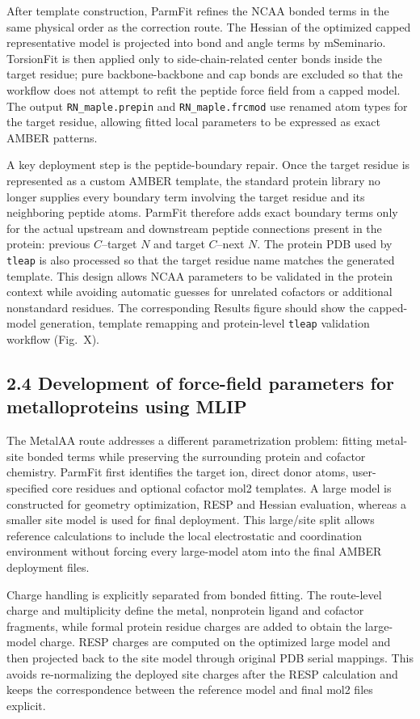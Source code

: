 After template construction, ParmFit refines the NCAA bonded terms in the same physical order as the correction route. The Hessian of the optimized capped representative model is projected into bond and angle terms by mSeminario. TorsionFit is then applied only to side-chain-related center bonds inside the target residue; pure backbone-backbone and cap bonds are excluded so that the workflow does not attempt to refit the peptide force field from a capped model. The output \texttt{RN\_maple.prepin} and \texttt{RN\_maple.frcmod} use renamed atom types for the target residue, allowing fitted local parameters to be expressed as exact AMBER patterns.

A key deployment step is the peptide-boundary repair. Once the target residue is represented as a custom AMBER template, the standard protein library no longer supplies every boundary term involving the target residue and its neighboring peptide atoms. ParmFit therefore adds exact boundary terms only for the actual upstream and downstream peptide connections present in the protein: previous $C$--target $N$ and target $C$--next $N$. The protein PDB used by \texttt{tleap} is also processed so that the target residue name matches the generated template. This design allows NCAA parameters to be validated in the protein context while avoiding automatic guesses for unrelated cofactors or additional nonstandard residues. The corresponding Results figure should show the capped-model generation, template remapping and protein-level \texttt{tleap} validation workflow (Fig.~X).

\subsection{2.4 Development of force-field parameters for metalloproteins using MLIP}

The MetalAA route addresses a different parametrization problem: fitting metal-site bonded terms while preserving the surrounding protein and cofactor chemistry. ParmFit first identifies the target ion, direct donor atoms, user-specified core residues and optional cofactor mol2 templates. A large model is constructed for geometry optimization, RESP and Hessian evaluation, whereas a smaller site model is used for final deployment. This large/site split allows reference calculations to include the local electrostatic and coordination environment without forcing every large-model atom into the final AMBER deployment files.

Charge handling is explicitly separated from bonded fitting. The route-level charge and multiplicity define the metal, nonprotein ligand and cofactor fragments, while formal protein residue charges are added to obtain the large-model charge. RESP charges are computed on the optimized large model and then projected back to the site model through original PDB serial mappings. This avoids re-normalizing the deployed site charges after the RESP calculation and keeps the correspondence between the reference model and final mol2 files explicit.

